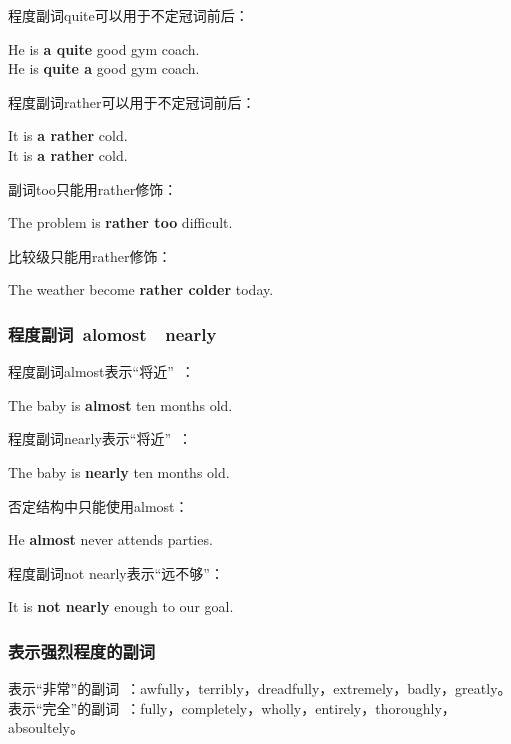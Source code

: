 \documentclass[UTF8]{ctexart}
\newcommand{\littf}[1]{{\hspace{3pt}\ttfamily #1}}
\begin{document}
\newpage

    程度副词\littf{quite\hspace{7pt}}可以用于不定冠词前后：
    \begin{center}
        \large\ttfamily
        He is \textbf{a quite} good gym coach.\\[3mm]
        He is \textbf{quite a} good gym coach.\\[6mm]
    \end{center}
    程度副词\littf{rather}可以用于不定冠词前后：
    \begin{center}
        \large\ttfamily
        It is \textbf{a rather} cold.\\[3mm]
        It is \textbf{a rather} cold.\\[6mm]
    \end{center}
    副词\littf{too}只能用\littf{rather}修饰：
    \begin{center}
        \large\ttfamily
        The problem is \textbf{rather too} difficult.\\[6mm]
    \end{center}
    比较级只能用\littf{rather}修饰：
    \begin{center}
        \large\ttfamily
        The weather become \textbf{rather colder} today.
    \end{center}\vspace{5pt}

\subsubsection{程度副词~\littf{alomost}~~\littf{nearly}}
    程度副词\littf{almost}表示“将近”~：
    \begin{center}
        \large\ttfamily
        The baby is \textbf{almost} ten months old.\\[6mm]
    \end{center}
    程度副词\littf{nearly}表示“将近”~：
    \begin{center}
        \large\ttfamily
        The baby is \textbf{nearly} ten months old.\\[6mm]
    \end{center}
    否定结构中只能使用\littf{almost}：
    \begin{center}
        \large\ttfamily
        He \textbf{almost} never attends parties.\\[6mm]
    \end{center}
    程度副词\littf{not nearly}表示“远不够”：
    \begin{center}
        \large\ttfamily
        It is \textbf{not nearly} enough to our goal.
    \end{center}\vspace{5pt}

\subsubsection{表示强烈程度的副词}
    表示“非常”的副词~：\littf{awfully}，\littf{terribly}，\littf{dreadfully}，\littf{extremely}，\littf{badly}，\littf{greatly}。\\[3mm]
    表示“完全”的副词~：\littf{fully}，\littf{completely}，\littf{wholly}，\littf{entirely}，\littf{thoroughly}，\littf{absoultely}。
\end{document}

